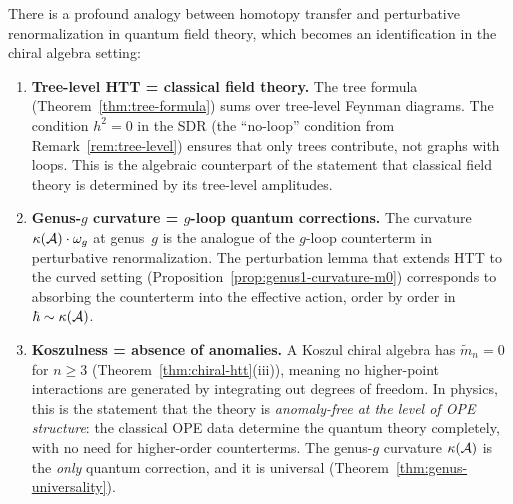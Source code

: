 \begin{remark}
\label{rem:renormalization-htt}
There is a profound analogy between homotopy transfer and
perturbative renormalization in quantum field theory, which becomes an
identification in the chiral algebra setting:

\begin{enumerate}[label=(\roman*)]
\item \textbf{Tree-level HTT = classical field theory.}
The tree formula (Theorem~\ref{thm:tree-formula}) sums over
tree-level Feynman diagrams.  The condition $h^2 = 0$ in the SDR
(the ``no-loop'' condition from Remark~\ref{rem:tree-level})
ensures that only trees contribute, not graphs with loops.
This is the algebraic counterpart of the statement that
classical field theory is determined by its tree-level amplitudes.

\item \textbf{Genus-$g$ curvature = $g$-loop quantum corrections.}
The curvature $\kappa(\mathcal{A}) \cdot \omega_g$ at genus~$g$ is the
analogue of the $g$-loop counterterm in perturbative
renormalization.  The perturbation lemma that extends HTT to
the curved setting (Proposition~\ref{prop:genus1-curvature-m0})
corresponds to absorbing the counterterm into the effective
action, order by order in $\hbar \sim \kappa(\mathcal{A})$.

\item \textbf{Koszulness = absence of anomalies.}
A Koszul chiral algebra has $\tilde{m}_n = 0$ for $n \geq 3$
(Theorem~\ref{thm:chiral-htt}(iii)), meaning no higher-point
interactions are generated by integrating out degrees of freedom.
In physics, this is the statement that the theory is
\emph{anomaly-free at the level of OPE structure}: the classical
OPE data determine the quantum theory completely, with no need
for higher-order counterterms.  The genus-$g$ curvature $\kappa(\mathcal{A})$
is the \emph{only} quantum correction, and it is universal
(Theorem~\ref{thm:genus-universality}).
\end{enumerate}
\end{remark}
